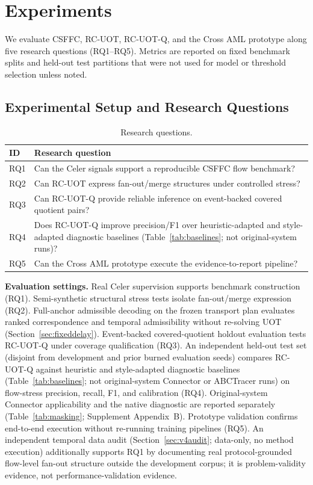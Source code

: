 
\section{Experiments}
\label{sec:experiments}

We evaluate CSFFC, RC-UOT, RC-UOT-Q, and the Cross AML prototype along five research questions (RQ1--RQ5). Metrics are reported on fixed benchmark splits and held-out test partitions that were not used for model or threshold selection unless noted.

\subsection{Experimental Setup and Research Questions}

\begin{table}[!t]
\caption{Research questions.}
\label{tab:rq}
\centering
\begin{tabular}{p{}p{}}
\toprule
ID & Research question \\
\midrule
RQ1 & Can the Celer signals support a reproducible CSFFC flow benchmark? \\
RQ2 & Can RC-UOT express fan-out/merge structures under controlled stress? \\
RQ3 & Can RC-UOT-Q provide reliable inference on event-backed covered quotient pairs? \\
RQ4 & Does RC-UOT-Q improve precision/F1 over heuristic-adapted and style-adapted diagnostic baselines (Table~\ref{tab:baselines}; not original-system runs)? \\
RQ5 & Can the Cross AML prototype execute the evidence-to-report pipeline? \\
\bottomrule
\end{tabular}
\end{table}

\textbf{Evaluation settings.} Real Celer supervision supports benchmark construction (RQ1). Semi-synthetic structural stress tests isolate fan-out/merge expression (RQ2). Full-anchor admissible decoding on the frozen transport plan evaluates ranked correspondence and temporal admissibility without re-solving UOT (Section~\ref{sec:fixeddelay}). Event-backed covered-quotient holdout evaluation tests RC-UOT-Q under coverage qualification (RQ3). An independent held-out test set (disjoint from development and prior burned evaluation seeds) compares RC-UOT-Q against heuristic and style-adapted diagnostic baselines (Table~\ref{tab:baselines}; not original-system Connector or ABCTracer runs) on flow-stress precision, recall, F1, and calibration (RQ4). Original-system Connector applicability and the native diagnostic are reported separately (Table~\ref{tab:masking}; Supplement Appendix~B). Prototype validation confirms end-to-end execution without re-running training pipelines (RQ5). An independent temporal data audit (Section~\ref{sec:v4audit}; data-only, no method execution) additionally supports RQ1 by documenting real protocol-grounded flow-level fan-out structure outside the development corpus; it is problem-validity evidence, not performance-validation evidence.

